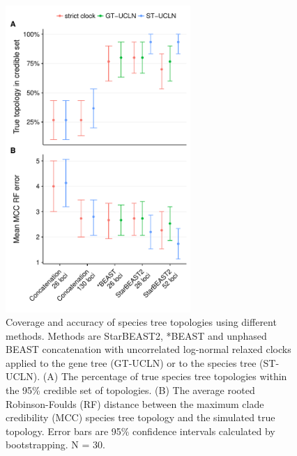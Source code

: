 \documentclass[12pt]{article}
\begin{document}
\begin{figure}[htb!]
\centering
\includegraphics[width=70mm]{topology_accuracy_unphased.pdf}
\caption
{Coverage and accuracy of species tree topologies using different methods.
Methods are StarBEAST2, *BEAST and unphased BEAST concatenation with uncorrelated
log-normal relaxed clocks applied to the gene tree (GT-UCLN) or to the species
tree (ST-UCLN). (A) The percentage of true species tree topologies within the
95\% credible set of topologies. (B) The average rooted Robinson-Foulds (RF)
distance between the maximum clade credibility (MCC) species tree topology and
the simulated true topology. Error bars are 95\% confidence intervals
calculated by bootstrapping. N = 30.}
\label{fig:treeTopologyError}
\end{figure}

\clearpage
\end{document}
